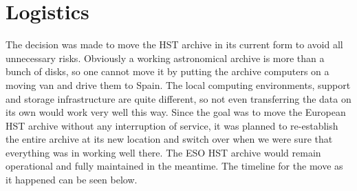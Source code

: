 \section{Logistics}


The decision was made to move the HST archive in its current form to avoid all unnecessary risks.
Obviously a working astronomical archive is more than a bunch of disks, so one cannot move it  by putting the archive computers  on a moving van and drive them to Spain.
The local computing environments, support and storage infrastructure are quite different, so not even transferring the data on its own would work very well this way.
Since the goal was to move the European HST archive without any interruption of service, it was planned to re-establish the entire archive at its new location and switch over when we were sure that everything was in working well there. The ESO HST archive would remain operational and fully maintained in the meantime. 
The timeline for the move as it happened can be seen below.

